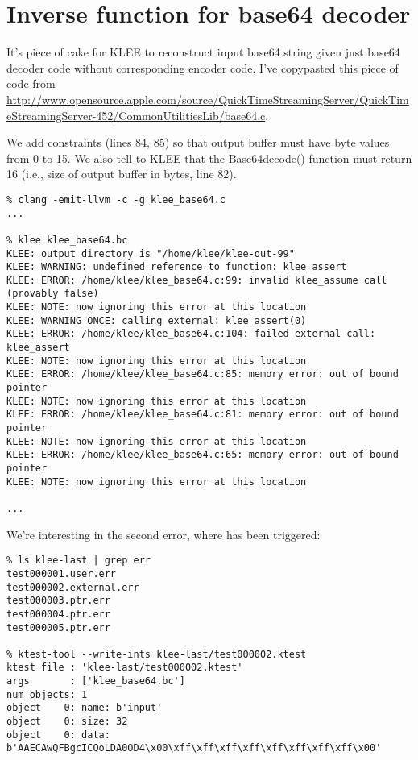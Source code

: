 \section{Inverse function for base64 decoder}

It's piece of cake for KLEE to reconstruct input base64 string given just base64 decoder code without corresponding encoder code.
I've copypasted this piece of code from
\url{http://www.opensource.apple.com/source/QuickTimeStreamingServer/QuickTimeStreamingServer-452/CommonUtilitiesLib/base64.c}.

We add constraints (lines 84, 85) so that output buffer must have byte values from 0 to 15.
We also tell to KLEE that the Base64decode() function must return 16 (i.e., size of output buffer in bytes, line 82).



\begin{lstlisting}
% clang -emit-llvm -c -g klee_base64.c
...

% klee klee_base64.bc
KLEE: output directory is "/home/klee/klee-out-99"
KLEE: WARNING: undefined reference to function: klee_assert
KLEE: ERROR: /home/klee/klee_base64.c:99: invalid klee_assume call (provably false)
KLEE: NOTE: now ignoring this error at this location
KLEE: WARNING ONCE: calling external: klee_assert(0)
KLEE: ERROR: /home/klee/klee_base64.c:104: failed external call: klee_assert
KLEE: NOTE: now ignoring this error at this location
KLEE: ERROR: /home/klee/klee_base64.c:85: memory error: out of bound pointer
KLEE: NOTE: now ignoring this error at this location
KLEE: ERROR: /home/klee/klee_base64.c:81: memory error: out of bound pointer
KLEE: NOTE: now ignoring this error at this location
KLEE: ERROR: /home/klee/klee_base64.c:65: memory error: out of bound pointer
KLEE: NOTE: now ignoring this error at this location

...
\end{lstlisting}

We're interesting in the second error, where  has been triggered:

\begin{lstlisting}
% ls klee-last | grep err
test000001.user.err
test000002.external.err
test000003.ptr.err
test000004.ptr.err
test000005.ptr.err

% ktest-tool --write-ints klee-last/test000002.ktest
ktest file : 'klee-last/test000002.ktest'
args       : ['klee_base64.bc']
num objects: 1
object    0: name: b'input'
object    0: size: 32
object    0: data: b'AAECAwQFBgcICQoLDA0OD4\x00\xff\xff\xff\xff\xff\xff\xff\xff\x00'
\end{lstlisting}

